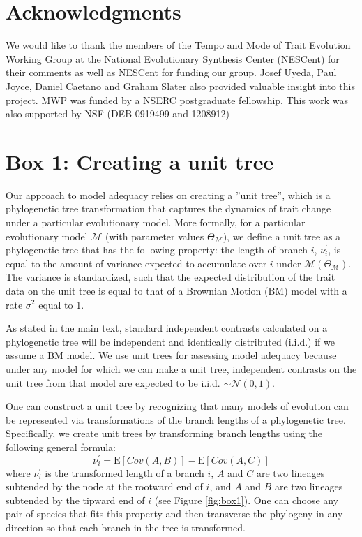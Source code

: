 \documentclass[a4paper,12pt]{article}
\begin{document}
\section{Acknowledgments}
We would like to thank the members of the Tempo and Mode of Trait Evolution Working Group at the National Evolutionary Synthesis Center (NESCent) for their comments as well as NESCent for funding our group. Josef Uyeda, Paul Joyce, Daniel Caetano and Graham Slater also provided valuable insight into this project. MWP was funded by a NSERC postgraduate fellowship. This work was also supported by NSF (DEB 0919499 and 1208912)

\newpage
\section{Box 1: Creating a unit tree}

Our approach to model adequacy relies on creating a ''unit tree'', which is a phylogenetic tree transformation that captures the dynamics of trait change under a particular evolutionary model. More formally, for a particular evolutionary model $\mathcal{M}$ (with parameter values $\Theta_{\mathcal{M}}$), we define a unit tree as a phylogenetic tree that has the following property: the length of branch $i$, $\nu_i ^\prime$, is equal to the amount of variance expected to accumulate over $i$ under $\mathcal{M}(\Theta_{\mathcal{M}})$. The variance is standardized, such that the expected distribution of the trait data on the unit tree is equal to that of a Brownian Motion (BM) model with a rate $\sigma^2$ equal to 1. 

As stated in the main text, standard independent contrasts calculated on a phylogenetic tree will be independent and identically distributed (i.i.d.) if we assume a BM model. We use unit trees for assessing model adequacy because under any model for which we can make a unit tree, independent contrasts on the unit tree from that model are expected to be i.i.d. $\sim \mathcal{N}(0,1)$.

One can construct a unit tree by recognizing that many models of evolution can be represented via transformations of the branch lengths of a phylogenetic tree. Specifically, we create unit trees by transforming branch lengths using the following general formula:
\begin{equation}
\nu_i^\prime = \mathrm{E}[Cov(A,B)] - \mathrm{E}[Cov(A,C)]
\end{equation}
where $\nu_i^\prime$ is the transformed length of a branch $i$, $A$ and $C$ are two lineages subtended by the node at the rootward end of $i$, and $A$ and $B$ are two lineages subtended by the tipward end of $i$ (see Figure \ref{fig:box1}). One can choose any pair of species that fits this property and then transverse the phylogeny in any direction so that each branch in the tree is transformed. 
\end{document}
